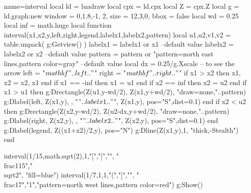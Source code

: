 \documentclass[border=5mm]{standalone}
\begin{document}
\begin{luadraw}{name=interval}
local ld = luadraw
local cpx = ld.cpx
local Z = cpx.Z
local g = ld.graph:new{ window = {0,1.8,-1, 2}, size = {12,3,0}, bbox = false }
local wd = 0.25
local inf = math.huge
local function interval(x1,x2,y,left,right,legend,labelx1,labelx2,pattern)
    local u1,u2,v1,v2 = table.unpack( g:Getview() )
    labelx1 = labelx1 or x1 --default value
    labelx2 = labelx2 or x2 --default value
    pattern = pattern or "pattern=north east lines,pattern color=gray" --default value
    local dx = 0.25/g.Xscale -- to see the arrow
    left = "$\\mathbf{"..left.."}$"
    right = "$\\mathbf{"..right.."}$"
    if x1 > x2 then x1, x2 = x2, x1 end
    if x1 == -inf then x1 = u1 end
    if x2 == inf then x2 = u2 end
    if x1 > u1 then
        g:Drectangle(Z(u1,y-wd/2), Z(x1,y+wd/2), "draw=none,"..pattern)
        g:Dlabel(left, Z(x1,y), {}, "$"..labelx1.."$", Z(x1,y), {pos="S",dist=0.1})
    end
    if x2 < u2 then
        g:Drectangle(Z(x2,y-wd/2), Z(u2-dx,y+wd/2), "draw=none,"..pattern)
        g:Dlabel(right, Z(x2,y), {}, "$"..labelx2.."$", Z(x2,y), {pos="S",dist=0.1})
    end
    g:Dlabel(legend, Z((x1+x2)/2,y), {pos="N"})
    g:Dline({Z(x1,y),1}, "thick,-Stealth")
end

interval(1/15,math.sqrt(2),1,"[","]","", "\\frac{1}{15}","\\sqrt{2}", "fill=blue")
interval(1/7,1,1,"(","]","", "\\frac{1}{7}","1","pattern=north west lines,pattern color=red")
g:Show()
\end{luadraw}
\end{document}
